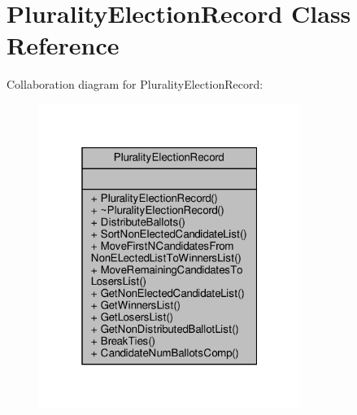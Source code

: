 \hypertarget{classPluralityElectionRecord}{}\section{Plurality\+Election\+Record Class Reference}
\label{classPluralityElectionRecord}


Collaboration diagram for Plurality\+Election\+Record\+:\nopagebreak
\begin{figure}[H]
\begin{center}
\leavevmode
\includegraphics[width=241pt]{classPluralityElectionRecord__coll__graph}
\end{center}
\end{figure}
